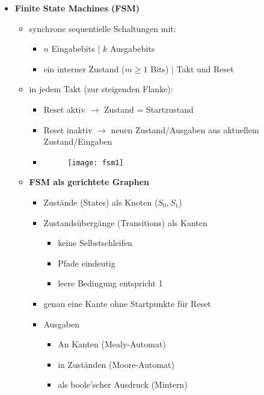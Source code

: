 \begin{itemize}

\item \textbf{Finite State Machines (FSM)}
	\begin{itemize}
	
	
	\item synchrone sequentielle Schaltungen mit:
		\begin{itemize}
		\item $n$ Eingabebits | $k$ Ausgabebits
		\item ein interner Zustand ($m \geq 1$ Bits) | Takt und Reset
		\end{itemize}
		
	\item in jedem Takt (zur steigenden Flanke):
		\begin{itemize}
		\item Reset aktiv $\rightarrow$ Zustand = Startzustand
		\item Reset inaktiv $\rightarrow$ neuen Zustand/Ausgaben aus aktuellem Zustand/Eingaben 
		\item[] \begin{figure}[H]
				\begin{center}
				\texttt{[image: fsm1]}
				\end{center}
				\end{figure}
		\end{itemize}
	
\item \textbf{FSM als gerichtete Graphen}
	\begin{itemize}
	
	\item  Zustände (States) als Knoten ($S_0,S_1$)
	\item Zustandsübergänge (Transitions) als Kanten
		\begin{itemize}
		\item keine Selbstschleifen
		\item Pfade eindeutig
		\item leere Bedingung entspricht 1
		\end{itemize}
	\item genau eine Kante ohne Startpunkte für Reset
	\item Ausgaben
		\begin{itemize}
		\item An Kanten (Mealy-Automat)
		\item in Zuständen (Moore-Automat)
		\item als boole'scher Ausdruck (Mintern)
		\end{itemize}
	

\end{itemize}
\end{itemize}
\end{itemize}

